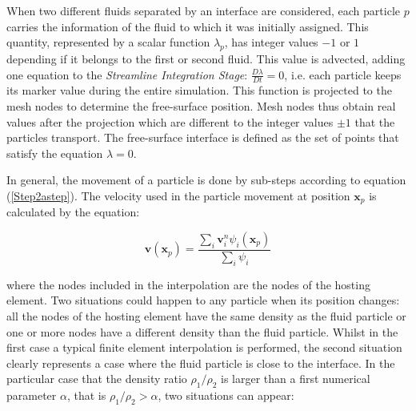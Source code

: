 When two different fluids separated by an interface are considered, each particle $p$ carries the information of the fluid to which it was initially assigned. This quantity, represented by a scalar function $\lambda_p$, has integer values $-1$ or $1$ depending if it belongs to the first or second fluid. This value is advected, adding one equation to the \textit{Streamline Integration Stage}: $\frac{D\lambda}{Dt}=0$, i.e. each particle keeps its marker value during the entire simulation. This function is projected to the mesh nodes to determine the free-surface position. Mesh nodes thus obtain real values after the projection which are different to the integer values $\pm1$ that the particles transport. The free-surface interface is defined as the set of points that satisfy the equation $\lambda=0$.

In general, the movement of a particle is done by sub-steps according to equation (\ref{Step2astep}). The velocity used in the particle movement at position $\mathbf{x}_p$ is calculated by the equation:

\begin{equation}\label{Interpolation}
    \displaystyle \mathbf{v}(\mathbf{x}_p)=\frac{\displaystyle \sum_{i}\mathbf{v}_i^n\psi_i(\mathbf{x}_p)}{\displaystyle \sum_{i}\psi_i}
\end{equation}

where the nodes included in the interpolation are the nodes of the hosting element. Two situations could happen to any particle when its position changes: all the nodes of the hosting element have the same density as the fluid particle or one or more nodes have a different density than the fluid particle. Whilst in the first case a typical finite element interpolation is performed, the second situation clearly represents a case where the fluid particle is close to the interface. In the particular case that the density ratio $\rho_1/\rho_2$ is larger than a first numerical parameter $\alpha$, that is $\rho_1/\rho_2>\alpha$, two situations can appear:

